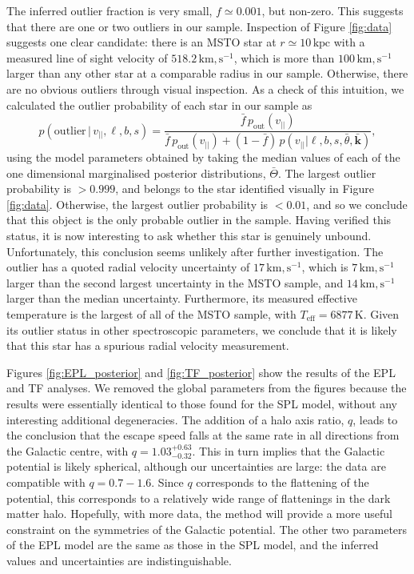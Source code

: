 \documentclass[useAMS,twocolumn,usenatbib]{mn2e}
\def\kpc{{\,\mathrm{kpc}}}
\def\km,s{{\,\mathrm{km,s^{-1}}}}
\def\vlos{{v_{||}}}
\begin{document}
The inferred outlier fraction is very small, $f \simeq 0.001$, but non-zero. 
This suggests that there are one or two outliers in our sample. 
Inspection of Figure \ref{fig:data} suggests one clear candidate: there is an MSTO star at $r\simeq10\kpc$ with a measured line of sight velocity of $518.2\km,s$, which is more than $100\km,s$ larger than any other star at a comparable radius in our sample. 
Otherwise, there are no obvious outliers through visual inspection. 
As a check of this intuition, we calculated the outlier probability of each star in our sample as
%
\begin{equation}
p(\mathrm{outlier}\,|\,\vlos,\ell,b,s) = \dfrac{\bar{f}\,p_\mathrm{out}(\vlos)}{\bar{f}\,p_\mathrm{out}(\vlos) + 
                                                      (1-\bar{f})\,p(\vlos | \ell,b,s,\bar{\theta},\bar{\boldsymbol{k}})},
\end{equation}
%     
using the model parameters obtained by taking the median values of each of the one dimensional marginalised posterior distributions, $\bar{\Theta}$.  
The largest outlier probability is $>0.999$, and belongs to the star identified visually in Figure \ref{fig:data}. 
Otherwise, the largest outlier probability is $<0.01$, and so we conclude that this object is the only probable outlier in the sample. 
Having verified this status, it is now interesting to ask whether this star is genuinely unbound. 
Unfortunately, this conclusion seems unlikely after further investigation. 
The outlier has a quoted radial velocity uncertainty of $17\km,s$, which is $7\km,s$ larger than the second largest uncertainty in the MSTO sample, and $14\km,s$ larger than the median uncertainty. 
Furthermore, its measured effective temperature is the largest of all of the MSTO sample, with $T_\mathrm{eff} = 6877\,\mathrm{K}$. 
Given its outlier status in other spectroscopic parameters, we conclude that it is likely that this star has a spurious radial velocity measurement.

Figures \ref{fig:EPL_posterior} and \ref{fig:TF_posterior} show the results of the EPL and TF analyses. 
We removed the global parameters from the figures because the results were essentially identical to those found for the SPL model, without any interesting additional degeneracies. 
The addition of a halo axis ratio, $q$, leads to the conclusion that the escape speed falls at the same rate in all directions from the Galactic centre, with $q = 1.03^{+0.63}_{-0.32}$. 
This in turn implies that the Galactic potential is likely spherical, although our uncertainties are large: the data are compatible with $q=0.7 - 1.6$. 
Since $q$ corresponds to the flattening of the potential, this corresponds to a relatively wide range of flattenings in the dark matter halo. 
Hopefully, with more data, the method will provide a more useful constraint on the symmetries of the Galactic potential. 
The other two parameters of the EPL model are the same as those in the SPL model, and the inferred values and uncertainties are indistinguishable.
\end{document}
